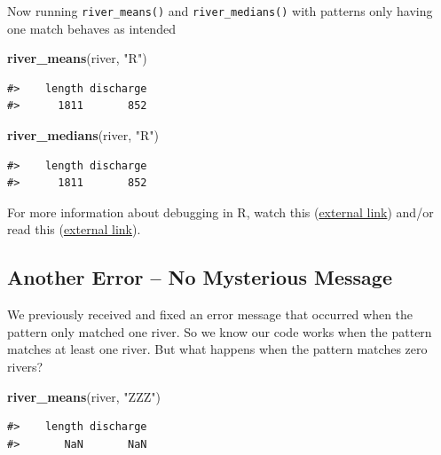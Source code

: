 \documentclass[
]{book}
\newenvironment{Shaded}{\begin{snugshade}}{\end{snugshade}}
\newcommand{\KeywordTok}[1]{\textcolor[rgb]{0.13,0.29,0.53}{\textbf{#1}}}
\newcommand{\NormalTok}[1]{#1}
\newcommand{\StringTok}[1]{\textcolor[rgb]{0.31,0.60,0.02}{#1}}
\begin{document}
Now running \texttt{river\_means()} and \texttt{river\_medians()} with patterns only having one match behaves as intended

\begin{Shaded}
\begin{Highlighting}[]
\KeywordTok{river_means}\NormalTok{(river, }\StringTok{"R"}\NormalTok{)}
\end{Highlighting}
\end{Shaded}

\begin{verbatim}
#>    length discharge 
#>      1811       852
\end{verbatim}

\begin{Shaded}
\begin{Highlighting}[]
\KeywordTok{river_medians}\NormalTok{(river, }\StringTok{"R"}\NormalTok{)}
\end{Highlighting}
\end{Shaded}

\begin{verbatim}
#>    length discharge 
#>      1811       852
\end{verbatim}

For more information about debugging in R, watch this (\href{https://www.rstudio.com/resources/rstudioconf-2020/object-of-type-closure-is-not-subsettable/}{external link}) and/or read this (\href{https://adv-r.hadley.nz/debugging.html}{external link}).

\hypertarget{error-zeromatch}{%
\subsection{Another Error -- No Mysterious Message}\label{error-zeromatch}}

We previously received and fixed an error message that occurred when the pattern only matched one river. So we know our code works when the pattern matches at least one river. But what happens when the pattern matches zero rivers?

\begin{Shaded}
\begin{Highlighting}[]
\KeywordTok{river_means}\NormalTok{(river, }\StringTok{"ZZZ"}\NormalTok{)}
\end{Highlighting}
\end{Shaded}

\begin{verbatim}
#>    length discharge 
#>       NaN       NaN
\end{verbatim}
\end{document}
